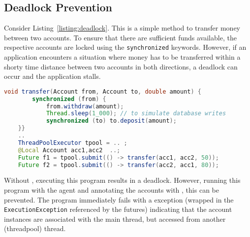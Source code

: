 \subsection{Deadlock Prevention}	

Consider Listing~\ref{listing:deadlock}.  This is a simple method to transfer money between two accounts. To ensure that there are sufficient funds available, the respective accounts are locked using the \texttt{synchronized} keywords.  However, if an application encounters a situation where money has to be transferred within a shorty time distance between two accounts in both directions, a deadlock can occur and the application stalls.

\begin{lstlisting}[language=Java, caption=Money transfer implementation prone to deadlock, label=listing:deadlock]
	void transfer(Account from, Account to, double amount) {
		synchronized (from) {
			from.withdraw(amount);
			Thread.sleep(1_000); // to simulate database writes 
			synchronized (to) to.deposit(amount);
	}}
	.. 
	ThreadPoolExecutor tpool = .. ;
	@Local Account acc1,acc2  ..;
	Future f1 = tpool.submit(() -> transfer(acc1, acc2, 50)); 
	Future f2 = tpool.submit(() -> transfer(acc2, acc1, 80));
\end{lstlisting}

Without \jdala, executing this program results in a deadlock.  However, running this program with the \jdala agent and annotating the accounts with \Local , this can be prevented. The program immediately fails with a \jdala exception (wrapped in the \texttt{ExecutionException} referenced by the futures) indicating that the account instances are associated with the main thread, but accessed from another (threadpool) thread. 
